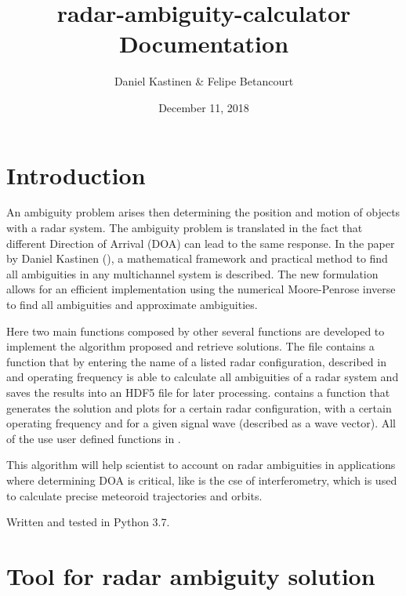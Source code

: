 \documentclass[letterpaper,12pt,english]{sphinxmanual}
\title{radar-ambiguity-calculator Documentation}
\date{December 11, 2018}
\author{Daniel Kastinen \& Felipe Betancourt}
\begin{document}
\maketitle
\sphinxtableofcontents
{}\label{\detokenize{index::doc}}



\chapter{Introduction}
\label{\detokenize{introduction:introduction}}\label{\detokenize{introduction::doc}}
An ambiguity problem arises then determining the position and motion of objects with a radar system. The ambiguity problem
is translated in the fact that different Direction of Arrival (DOA) can lead to the same response. In  the paper
 by Daniel Kastinen (), a mathematical
framework and practical method to find all ambiguities in any multichannel system is described. The new formulation
allows for an efficient implementation using the numerical Moore-Penrose inverse to find all
ambiguities and approximate ambiguities.

Here two main functions composed by other several functions are developed to implement the algorithm proposed and
retrieve solutions. The  file contains a function that by entering the name of a listed radar
configuration, described in  and operating frequency is able to calculate all ambiguities of a radar
system and saves the results into an HDF5 file for later processing.  contains a function that
generates the solution and plots for a certain radar configuration, with a certain operating frequency and for a given
signal wave (described as a wave vector). All of the use user defined functions in .

This algorithm will help scientist to account on radar ambiguities in applications where determining DOA is critical,
like is the cse of interferometry, which is used to calculate precise meteoroid trajectories and orbits.

Written and tested in Python 3.7.


\chapter{Tool for radar ambiguity solution}
\label{\detokenize{radar:module-ambiguity_calculator}}\label{\detokenize{radar:tool-for-radar-ambiguity-solution}}\label{\detokenize{radar::doc}}
\end{document}

